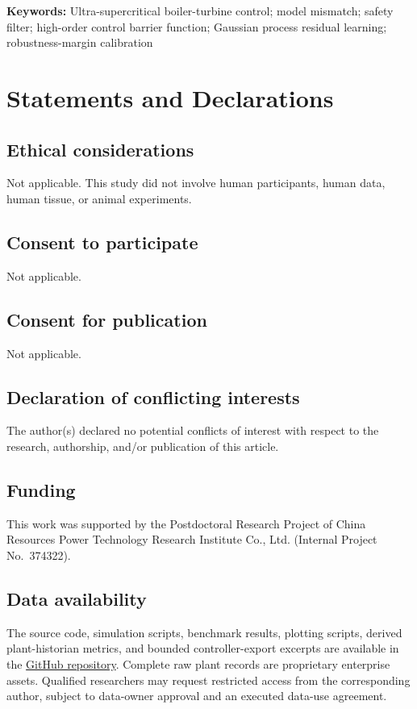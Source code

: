 \documentclass[12pt,a4paper]{article}
\begin{document}
\textbf{Keywords:} Ultra-supercritical boiler-turbine control; model mismatch; safety filter; high-order control barrier function; Gaussian process residual learning; robustness-margin calibration







\section*{Statements and Declarations}

\subsection*{Ethical considerations}
Not applicable. This study did not involve human participants, human data, human tissue, or animal experiments.

\subsection*{Consent to participate}
Not applicable.

\subsection*{Consent for publication}
Not applicable.

\subsection*{Declaration of conflicting interests}
The author(s) declared no potential conflicts of interest with respect to the research, authorship, and/or publication of this article.

\subsection*{Funding}
This work was supported by the Postdoctoral Research Project of China Resources Power Technology Research Institute Co., Ltd. (Internal Project No.\ 374322).

\subsection*{Data availability}
The source code, simulation scripts, benchmark results, plotting scripts, derived plant-historian metrics, and bounded controller-export excerpts are available in the \href{https://github.com/VickylastShao/Robust-HOCBF-Safety-Filtering-for-Supercritical-Power-Plants-under-Model-Mismatch}{GitHub repository}. Complete raw plant records are proprietary enterprise assets. Qualified researchers may request restricted access from the corresponding author, subject to data-owner approval and an executed data-use agreement.
\end{document}
